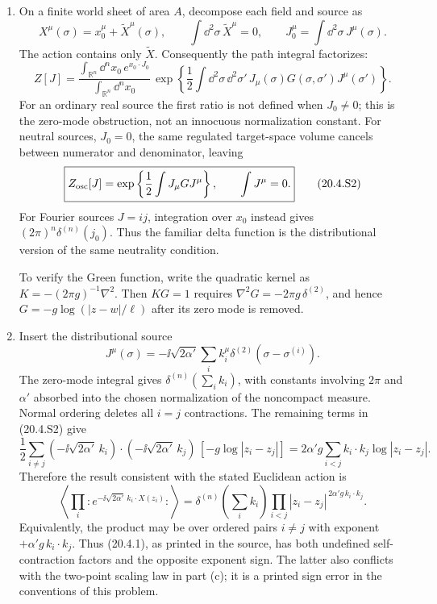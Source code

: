 \begin{enumerate}
  \begin{enumerate}
    \item[(a)]
    On a finite world sheet of area \(A\), decompose each field and source
    as
    \[
      X^\mu(\sigma)=x_0^\mu+\widetilde X^\mu(\sigma),
      \qquad
      \int \dd^2\sigma\,\widetilde X^\mu=0,
      \qquad
      J_0^\mu=\int \dd^2\sigma\,J^\mu(\sigma).
    \]
    The action contains only \(\widetilde X\).  Consequently the path
    integral factorizes:
    \[
      Z[J]=
      \frac{\int_{\mathbb R^n}\dd^nx_0\,
        e^{x_0\cdot J_0}}
      {\int_{\mathbb R^n}\dd^nx_0}\,
      \exp\left\{\frac12\int \dd^2\sigma\,\dd^2\sigma'\,
        J_\mu(\sigma)G(\sigma,\sigma')J^\mu(\sigma')\right\}.
      \tag{20.4.S1}
    \]
    For an ordinary real source the first ratio is not defined when
    \(J_0\neq0\); this is the zero-mode obstruction, not an innocuous
    normalization constant.  For neutral sources, \(J_0=0\), the same
    regulated target-space volume cancels between numerator and
    denominator, leaving
    \[
      \boxed{Z_{\rm osc}[J]=
      \exp\left\{\frac12\int J_\mu GJ^\mu\right\},
      \qquad \int J^\mu=0.}
      \tag{20.4.S2}
    \]
    For Fourier sources \(J=ij\), integration over \(x_0\) instead gives
    \((2\pi)^n\delta^{(n)}(j_0)\).  Thus the familiar delta function is
    the distributional version of the same neutrality condition.

    To verify the Green function, write the quadratic kernel as
    \(K=-(2\pi g)^{-1}\nabla^2\).  Then \(KG=1\) requires
    \(\nabla^2G=-2\pi g\,\delta^{(2)}\), and hence
    \(G=-g\log(|z-w|/\ell)\) after its zero mode is removed.

    \item[(b)]
    Insert the distributional source
    \[
      J^\mu(\sigma)=-\ii\sqrt{2\alpha'}
        \sum_i k_i^\mu\delta^{(2)}(\sigma-\sigma^{(i)}).
    \]
    The zero-mode integral gives
    \(\delta^{(n)}(\sum_i k_i)\), with constants involving
    \(2\pi\) and \(\alpha'\) absorbed into the chosen normalization of the
    noncompact measure.  Normal ordering deletes all \(i=j\)
    contractions.  The remaining terms in (20.4.S2) give
    \[
      \frac12\sum_{i\ne j}
      (-\ii\sqrt{2\alpha'}\,k_i)\mathbin{\cdot}
      (-\ii\sqrt{2\alpha'}\,k_j)\,
      [-g\log|z_i-z_j|]
      =
      2\alpha'g\sum_{i<j}k_i\mathbin{\cdot}k_j
        \log|z_i-z_j|.
    \]
    Therefore the result consistent with the stated Euclidean action is
    \[
      \boxed{
      \left\langle\prod_i
        :e^{-\ii\sqrt{2\alpha'}\,k_i\cdot X(z_i)}:
      \right\rangle
      =
      \delta^{(n)}\!\left(\sum_i k_i\right)
      \prod_{i<j}|z_i-z_j|^{\,2\alpha'g\,k_i\cdot k_j}.}
      \tag{20.4.S3}
    \]
    Equivalently, the product may be over ordered pairs \(i\ne j\) with
    exponent \(+\alpha'g\,k_i\cdot k_j\).  Thus (20.4.1), as printed in
    the source, has both undefined self-contraction factors and the
    opposite exponent sign.  The latter also conflicts with the
    two-point scaling law in part (c); it is a printed sign error in the
    conventions of this problem.


\end{enumerate}
\end{enumerate}
